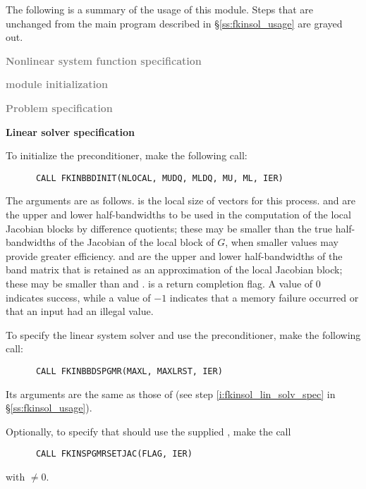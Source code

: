 The following is a summary of the usage of this module. Steps that are unchanged
from the main program described in \S\ref{ss:fkinsol_usage} are grayed out.


\begin{Steps}
  
\item \textcolor{gray}{\bf Nonlinear system function specification}

\item \textcolor{gray}{\bf {\nvector} module initialization}

\item \textcolor{gray}{\bf Problem specification}

\item {\bf Linear solver specification}

  To initialize the {\kinbbdpre} preconditioner, make the following call:
\begin{verbatim}
      CALL FKINBBDINIT(NLOCAL, MUDQ, MLDQ, MU, ML, IER)
\end{verbatim}
  The arguments are as follows.
   is the local size of vectors for this process.
   and  are the upper and lower half-bandwidths to be used
  in the computation of the local Jacobian blocks by difference quotients;
  these may be smaller than the true half-bandwidths of the Jacobian of the
  local block of $G$, when smaller values may provide greater efficiency.
   and  are the upper and lower half-bandwidths of the band
  matrix that is retained as an approximation of the local Jacobian block;
  these may be smaller than  and .
   is a return completion flag.  A value of $0$ indicates success, while
  a value of $-1$ indicates that a memory failure occurred or that an input had
  an illegal value.
  
  To specify the {\spgmr} linear system solver and use the {\kinbbdpre}
  preconditioner, make the following call:
\begin{verbatim}
      CALL FKINBBDSPGMR(MAXL, MAXLRST, IER)
\end{verbatim}
  Its arguments are the same as those of 
  (see step \ref{i:fkinsol_lin_solv_spec} in \S\ref{ss:fkinsol_usage}).
  
  Optionally, to specify that {\spgmr} should use the supplied , 
  make the call
\begin{verbatim}
      CALL FKINSPGMRSETJAC(FLAG, IER)
\end{verbatim}
  with  $\neq 0$.
  

\end{Steps}
